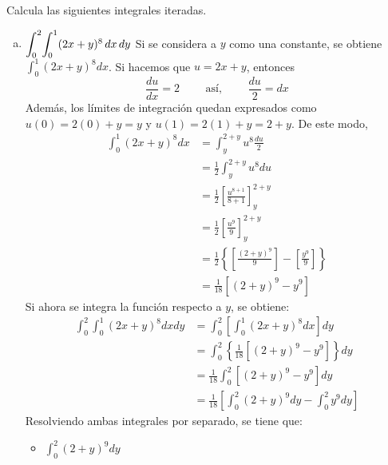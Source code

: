 \documentclass[12pt]{exam}
\begin{document}
\begin{questions}
  \question
  Calcula las siguientes integrales iteradas.
  \begin{enumerate}[a)]
  \item $\mathlarger{\int}_0^2\mathlarger{\int}_0^{1}(2x+y)^8\,dx\,dy$
    Si se considera a $y$ como una constante, se obtiene $ \int_{0}^{1} (2x+y)^8 dx $. Si hacemos que $u = 2x+y$, entonces
    $$ \frac{du}{dx}=2 \qquad \text{ así, } \qquad \frac{du}{2}=dx $$
    Además, los límites de integración quedan expresados como $u(0)=2(0)+y=y$ y $u(1)=2(1)+y=2+y$. De este modo,
    \begin{align*}
      \int_{0}^{1} (2x+y)^8 dx 
      &= \int_{y}^{2+y} u^8 \frac{du}{2}  \\
      &= \frac{1}{2} \int_{y}^{2+y} u^8 du \\
      &= \frac{1}{2} \left[ \frac{u^{8+1}}{8+1}\right]_y^{2+y} \\
      &= \frac{1}{2} \left[ \frac{u^9}{9}\right]_y^{2+y}  \\
      &= \frac{1}{2} \left\{ \left[ \frac{(2+y)^9}{9}\right] - \left[ \frac{y^9}{9}\right] \right\} \\
      &= \frac{1}{18} \left[ (2+y)^9 - y^9 \right] 
    \end{align*}
    Si ahora se integra la función respecto a $y$, se obtiene:
    \begin{align*}
      \int_{0}^{2}\int_{0}^{1} (2x+y)^8 dx dy
      &= \int_{0}^{2} \left[\int_{0}^{1} (2x+y)^8 dx \right] dy \\
      &= \int_{0}^{2} \left\{ \frac{1}{18} \left[ (2+y)^9 - y^9 \right] \right\} dy \\
      &= \frac{1}{18} \int_{0}^{2} \left[ (2+y)^9 - y^9 \right] dy \\
      &= \frac{1}{18} \left[ \int_0^2(2+y)^9dy - \int_0^2y^9dy \right]
    \end{align*}
    Resolviendo ambas integrales por separado, se tiene que:
    
    \begin{multicols}{2}
      \begin{itemize}[format=\textbf]
      \item $\int_0^2(2+y)^9dy$
        

\end{itemize}
\end{multicols}
\end{enumerate}
\end{questions}
\end{document}
